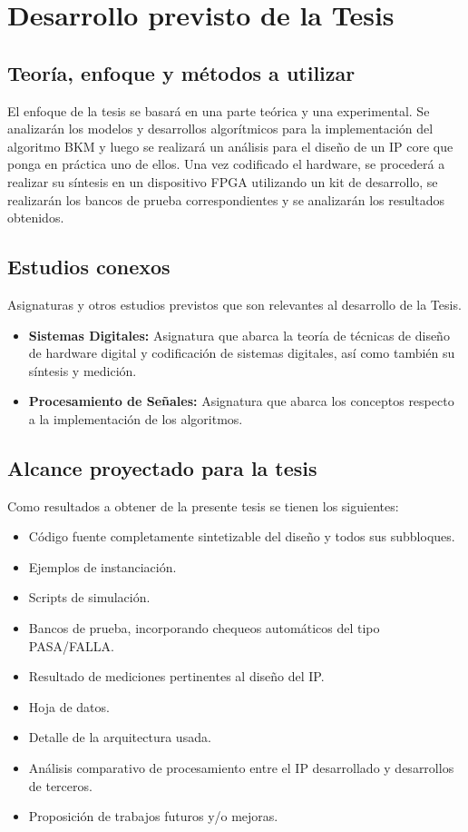 \documentclass[a4paper]{article}
\begin{document}
\section{Desarrollo previsto de la Tesis}

\subsection{Teoría, enfoque y métodos a utilizar}

El enfoque de la tesis se basará en una parte teórica y una experimental.
Se analizarán los modelos y desarrollos algorítmicos para la implementación del algoritmo BKM y luego se realizará un análisis para el diseño de un IP core que ponga en práctica uno de ellos. Una vez codificado el hardware, se procederá a realizar su síntesis en un dispositivo FPGA utilizando un kit de desarrollo, se realizarán los bancos de prueba correspondientes y se analizarán los resultados obtenidos.

\subsection{Estudios conexos}

Asignaturas y otros estudios previstos que son relevantes al desarrollo de la Tesis.

\begin{itemize}
   \item \textbf{Sistemas Digitales:} Asignatura que abarca la teoría de técnicas de diseño de hardware digital y codificación de sistemas digitales, así como también su síntesis y medición.
   \item \textbf{Procesamiento de Señales:} Asignatura que abarca los conceptos respecto a la implementación de los algoritmos.
\end{itemize}

\subsection{Alcance proyectado para la tesis}

Como resultados a obtener de la presente tesis se tienen los siguientes:

\begin{itemize}
   \item Código fuente completamente sintetizable del diseño y todos sus subbloques.
   \item Ejemplos de instanciación.
   \item Scripts de simulación.
   \item Bancos de prueba, incorporando chequeos automáticos del tipo PASA/FALLA.
   \item Resultado de mediciones pertinentes al diseño del IP.
   \item Hoja de datos.
   \item Detalle de la arquitectura usada.
   \item Análisis comparativo de procesamiento entre el IP desarrollado y desarrollos de terceros.
   \item Proposición de trabajos futuros y/o mejoras.
\end{itemize}
\end{document}
